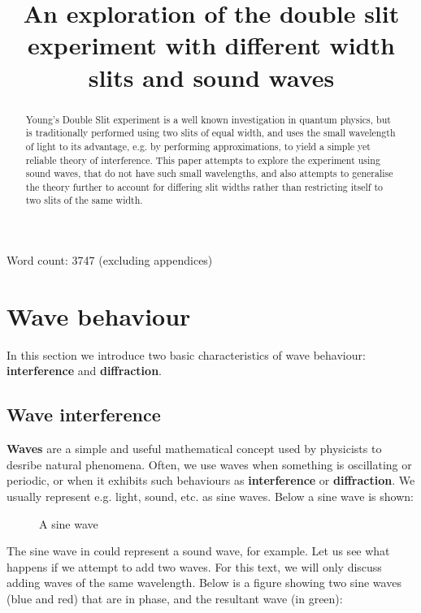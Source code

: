 \documentclass{paper}
\date{}
\author{}
\title{An exploration of the double slit experiment with different width slits and sound waves}
\begin{document}
 
\maketitle
\begin{abstract}
    Young's Double Slit experiment is a well known investigation
    in quantum physics, but is traditionally performed using two
    slits of equal width, and uses the small wavelength of light
    to its advantage, e.g. by performing approximations, to yield
    a simple yet reliable theory of interference. This paper 
    attempts to explore the experiment using sound waves,
    that do not have such small wavelengths, and also attempts to 
    generalise the theory further to account for differing slit widths
    rather than restricting itself to two slits of the same width.
\end{abstract}

Word count: 3747 (excluding appendices)

\pagebreak
\tableofcontents
\pagebreak
\section{Wave behaviour}
In this section we introduce two basic characteristics of wave behaviour: \textbf{interference} and \textbf{diffraction}. 
\subsection{Wave interference}
\textbf{Waves} are a simple and useful mathematical concept used by physicists to desribe natural phenomena. Often, we use waves when something is oscillating or periodic, or when it exhibits such behaviours as \textbf{interference} or \textbf{diffraction}. We usually represent e.g. light, sound, etc. as sine waves. Below a sine wave is shown:

\begin{figure}[H]
\caption{A sine wave}
\label{fig:sine-wave}
\end{figure}

The sine wave in  could represent a sound wave, for example. Let us see what happens if we attempt to add two waves. For this text, we will only discuss adding waves of the same wavelength. Below is a figure showing two sine waves (blue and red) that are in phase, and the resultant wave (in green):
\end{document}
